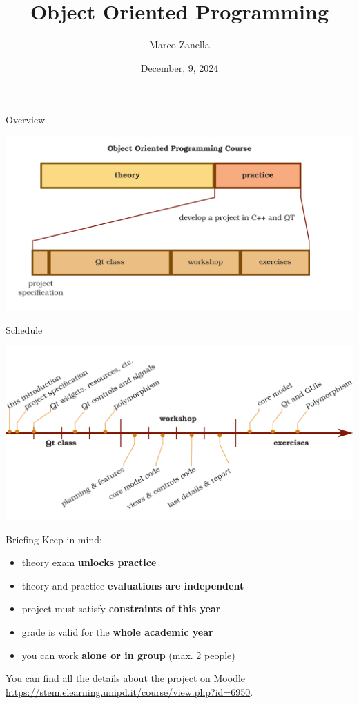 \documentclass[11pt]{beamer}
\author{Marco Zanella}
\title{Object Oriented Programming}
\institute{University of Padova}
\date{December, 9, 2024}
\renewcommand{\emph}[1]{\textbf{#1}}
\begin{document}
\begin{frame}
\titlepage
\end{frame}

\begin{frame}{Overview}
 \begin{center}
  \includegraphics[width=1.0\textwidth]{assets/overview}
 \end{center}
\end{frame}

\begin{frame}{Schedule}
 \begin{center}
  \includegraphics[width=1.0\textwidth]{assets/schedule}
 \end{center}
\end{frame}

\begin{frame}{Briefing}
 Keep in mind:
 \begin{itemize}
  \item theory exam \emph{unlocks practice}
  \item theory and practice \emph{evaluations are independent}
  \item project must satisfy \emph{constraints of this year}
  \item grade is valid for the \emph{whole academic year}
  \item you can work \emph{alone or in group} (max. 2 people)
 \end{itemize}
 You can find all the details about the project on Moodle \url{https://stem.elearning.unipd.it/course/view.php?id=6950}.
\end{frame}
\end{document}
